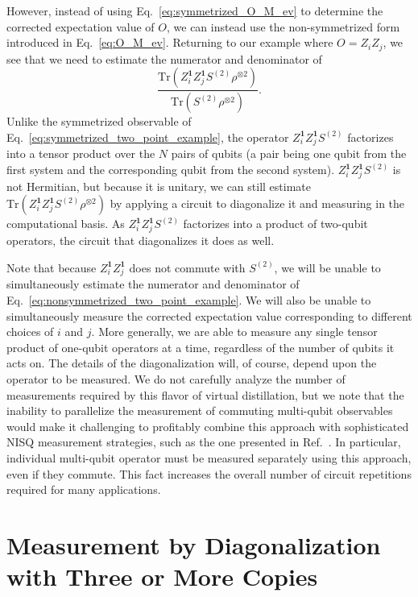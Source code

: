 \documentclass[
amsmath,
amssymb,
aps,
pra,
reprint,
twocolumn,
superscriptaddress,
longbibliography,
showkeys,
floatfix
]{revtex4-1}
\def\tr{\mathrm{Tr}}
\newcommand{\eq}[1]{Eq.~\hyperref[eq:#1]{\ref*{eq:#1}}}
\begin{document}
However, instead of using \eq{symmetrized_O_M_ev} to determine the corrected
expectation value of \(O\), we can instead use the non-symmetrized form
introduced in \eq{O_M_ev}.
Returning to our example where \(O = Z_i Z_j\), we see that we need to estimate
the numerator and denominator of
\begin{equation}
  \frac{\tr(Z_i^\textbf{1}Z_j^\textbf{1} S^{(2)} \rho^{\otimes 2})}{\tr(S^{(2)} \rho^{\otimes 2})}.
  \label{eq:nonsymmetrized_two_point_example}
\end{equation}
Unlike the symmetrized observable of \eq{symmetrized_two_point_example}, the
operator \(Z_i^\textbf{1} Z_j^\textbf{1} S^{(2)}\) factorizes into a tensor
product over the \(N\) pairs of qubits (a pair being one qubit from the first system and the corresponding qubit from the second system).
\(Z_i^\textbf{1} Z_j^\textbf{1} S^{(2)}\) is not Hermitian, but because it is
unitary, we can still estimate \(\tr(Z_i^\textbf{1} Z_j^\textbf{1} S^{(2)}
\rho^{\otimes 2})\) by applying a circuit to diagonalize it and measuring in the
computational basis.
As \(Z_i^\textbf{1} Z_j^\textbf{1} S^{(2)}\) factorizes into a product of
two-qubit operators, the circuit that diagonalizes it does as well.

Note that because \(Z_i^\textbf{1}Z_j^\textbf{1}\) does not commute with
\(S^{(2)}\), we will be unable to simultaneously estimate the numerator and
denominator of \eq{nonsymmetrized_two_point_example}. 
We will also be unable to simultaneously measure the corrected expectation value
corresponding to different choices of \(i\) and \(j\). 
More generally, we are able to measure any single tensor product of one-qubit
operators at a time, regardless of the number of qubits it acts on. 
The details of the diagonalization will, of course, depend upon the operator to
be measured.
We do not carefully analyze the number of measurements required by this flavor
of virtual distillation, but we note that the inability to parallelize the
measurement of commuting multi-qubit observables would make it challenging to
profitably combine this approach with sophisticated NISQ measurement strategies,
such as the one presented in Ref.~. 
In particular, individual multi-qubit operator must be measured separately using
this approach, even if they commute. 
This fact increases the overall number of circuit repetitions required for many
applications.

\section{Measurement by Diagonalization with Three or More Copies}
\label{app:diagonalize_three_or_more}
\end{document}
